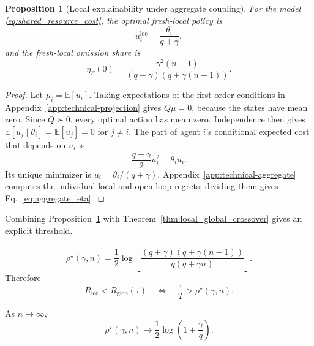 \documentclass[11pt]{article}
\newtheorem{proposition}{Proposition}
\begin{document}
\begin{proposition}[Local explainability under aggregate coupling]
\label{prop:aggregate_local}
For the model \eqref{eq:shared_resource_cost}, the optimal fresh-local policy
is
\begin{equation}
    u_i^{\mathrm{loc}}
    =
    \frac{\theta_i}{q+\gamma},
    \label{eq:optimal_local_shared}
\end{equation}
and the fresh-local omission share is
\begin{equation}
    \boxed{
    \eta_S(0)
    =
    \frac{
        \gamma^2(n-1)
    }{
        (q+\gamma)
        \left(
            q+\gamma(n-1)
        \right)
    }.
    }
    \label{eq:aggregate_eta}
\end{equation}
\end{proposition}

\begin{proof}
Let $\mu_i=\mathbb E[u_i]$. Taking expectations of the first-order
conditions in Appendix~\ref{app:technical-projection} gives $Q\mu=0$,
because the states have mean zero. Since $Q\succ0$, every optimal action
has mean zero. Independence then gives
$\mathbb E[u_j\mid\theta_i]=\mathbb E[u_j]=0$ for $j\ne i$.
The part of agent $i$'s conditional expected cost that depends on $u_i$ is
\[
\frac{q+\gamma}{2}u_i^2-\theta_i u_i.
\]
Its unique minimizer is $u_i=\theta_i/(q+\gamma)$.
Appendix~\ref{app:technical-aggregate} computes the individual local and
open-loop regrets; dividing them gives Eq.~\eqref{eq:aggregate_eta}.
\end{proof}

Combining Proposition~\ref{prop:aggregate_local} with
Theorem~\ref{thm:local_global_crossover} gives an explicit threshold.

\begin{equation}
    \boxed{
    \rho^\star(\gamma,n)
    =
    \frac{1}{2}
    \log
    \left[
        \frac{
            (q+\gamma)
            \left(
                q+\gamma(n-1)
            \right)
        }{
            q(q+\gamma n)
        }
    \right].
    }
    \label{eq:aggregate_rho_star}
\end{equation}
Therefore
\begin{equation}
    R_{\mathrm{loc}}
    <
    R_{\mathrm{glob}}(\tau)
    \quad\Longleftrightarrow\quad
    \frac{\tau}{T}
    >
    \rho^\star(\gamma,n).
    \label{eq:aggregate_crossover}
\end{equation}

As $n\rightarrow\infty$,
\begin{equation}
    \boxed{
    \rho^\star(\gamma,n)
    \longrightarrow
    \frac{1}{2}
    \log
    \left(
        1+\frac{\gamma}{q}
    \right).
    }
    \label{eq:large_n_threshold}
\end{equation}
\end{document}
